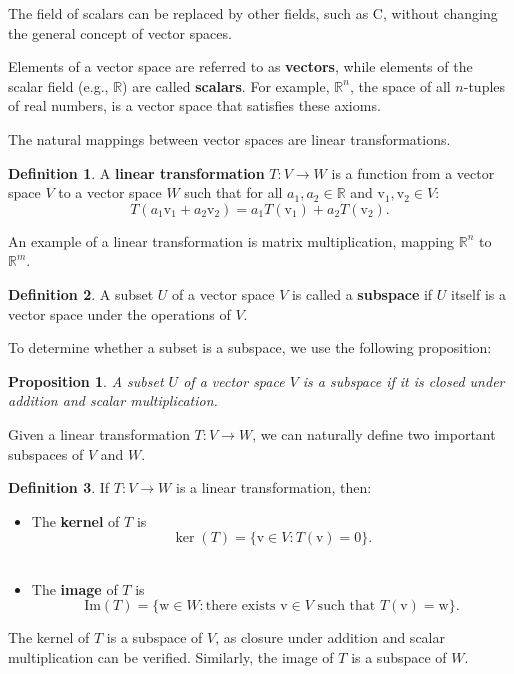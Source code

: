 \documentclass[
]{book}
\providecommand{\tightlist}{%
  \setlength{\itemsep}{0pt}\setlength{\parskip}{0pt}}
\newtheorem{proposition}{Proposition}[chapter]
\theoremstyle{definition}
\newtheorem{definition}{Definition}[chapter]
\theoremstyle{definition}
\theoremstyle{definition}
\theoremstyle{definition}
\theoremstyle{remark}
\begin{document}
The field of scalars can be replaced by other fields, such as \(\mathrm{C}\), without changing the general concept of vector spaces.

Elements of a vector space are referred to as \textbf{vectors}, while elements of the scalar field (e.g., \(\mathbb{R}\)) are called \textbf{scalars}. For example, \(\mathbb{R}^n\), the space of all \(n\)-tuples of real numbers, is a vector space that satisfies these axioms.

The natural mappings between vector spaces are linear transformations.

\begin{definition}
A \textbf{linear transformation} \(T : V \to W\) is a function from a vector space \(V\) to a vector space \(W\) such that for all \(a_1, a_2 \in \mathbb{R}\) and \(\mathrm{v}_1, \mathrm{v}_2 \in V\):\\
\[
T(a_1 \mathrm{v}_1 + a_2 \mathrm{v}_2) = a_1 T(\mathrm{v}_1) + a_2 T(\mathrm{v}_2).
\]

An example of a linear transformation is matrix multiplication, mapping \(\mathbb{R}^n\) to \(\mathbb{R}^m\).
\end{definition}

\begin{definition}
A subset \(U\) of a vector space \(V\) is called a \textbf{subspace} if \(U\) itself is a vector space under the operations of \(V\).

To determine whether a subset is a subspace, we use the following proposition:
\end{definition}

\begin{proposition}
A subset \(U\) of a vector space \(V\) is a subspace if it is closed under addition and scalar multiplication.
\end{proposition}

Given a linear transformation \(T : V \to W\), we can naturally define two important subspaces of \(V\) and \(W\).

\begin{definition}
If \(T : V \to W\) is a linear transformation, then:

\begin{itemize}
\tightlist
\item
  The \textbf{kernel} of \(T\) is\\
  \[
  \ker(T) = \{ \mathrm{v} \in V : T(\mathrm{v}) = 0 \}.
  \]\\
\item
  The \textbf{image} of \(T\) is\\
  \[
  \text{Im}(T) = \{ \mathrm{w} \in W : \text{there exists } \mathrm{v} \in V \text{ such that } T(\mathrm{v}) = \mathrm{w} \}.
  \]
\end{itemize}

The kernel of \(T\) is a subspace of \(V\), as closure under addition and scalar multiplication can be verified. Similarly, the image of \(T\) is a subspace of \(W\).
\end{definition}
\end{document}
